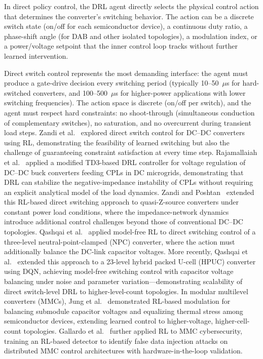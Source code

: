 \documentclass[manuscript,screen,review]{acmart}
\begin{document}
In direct policy control, the DRL agent directly selects the physical control action that determines the converter's switching behavior.
The action can be a discrete switch state (on/off for each semiconductor device), a continuous duty ratio, a phase-shift angle (for DAB and other isolated topologies), a modulation index, or a power/voltage setpoint that the inner control loop tracks without further learned intervention.

Direct switch control represents the most demanding interface: the agent must produce a gate-drive decision every switching period (typically 10--50~$\mu$s for hard-switched converters, and 100--500~$\mu$s for higher-power applications with lower switching frequencies).
The action space is discrete (on/off per switch), and the agent must respect hard constraints: no shoot-through (simultaneous conduction of complementary switches), no saturation, and no overcurrent during transient load steps.
Zandi et al.~\cite{zandi2023voltage} explored direct switch control for DC--DC converters using RL, demonstrating the feasibility of learned switching but also the challenge of guaranteeing constraint satisfaction at every time step.
Rajamallaiah et al.~\cite{rajamallaiah2024deep} applied a modified TD3-based DRL controller for voltage regulation of DC--DC buck converters feeding CPLs in DC microgrids, demonstrating that DRL can stabilize the negative-impedance instability of CPLs without requiring an explicit analytical model of the load dynamics.
Zandi and Poshtan~\cite{zandi2023voltage_quasi} extended this RL-based direct switching approach to quasi-Z-source converters under constant power load conditions, where the impedance-network dynamics introduce additional control challenges beyond those of conventional DC--DC topologies.
Qashqai et al.~\cite{qashqai2023model} applied model-free RL to direct switching control of a three-level neutral-point-clamped (NPC) converter, where the action must additionally balance the DC-link capacitor voltages.
More recently, Qashqai et al.~\cite{qashqai2025implementation} extended this approach to a 23-level hybrid packed U-cell (HPUC) converter using DQN, achieving model-free switching control with capacitor voltage balancing under noise and parameter variation---demonstrating scalability of direct switch-level DRL to higher-level-count topologies.
In modular multilevel converters (MMCs), Jung et al.~\cite{jung2022reinforcement} demonstrated RL-based modulation for balancing submodule capacitor voltages and equalizing thermal stress among semiconductor devices, extending learned control to higher-voltage, higher-cell-count topologies.
Gallardo et al.~\cite{gallardo2024reinforcement} further applied RL to MMC cybersecurity, training an RL-based detector to identify false data injection attacks on distributed MMC control architectures with hardware-in-the-loop validation.
\end{document}
